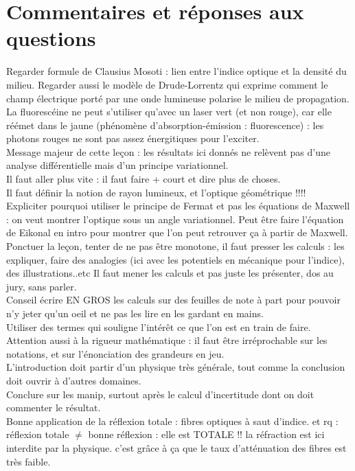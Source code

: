 \documentclass[12pt,prb,aps,epsf]{report}
\begin{document}
\section{Commentaires et réponses aux questions}
Regarder formule de Clausius Mosoti : lien entre l'indice optique et la densité du milieu. Regarder aussi le modèle de Drude-Lorrentz qui exprime comment le champ électrique porté par une onde lumineuse polarise le milieu de propagation. \\
La fluorescéine ne peut s'utiliser qu'avec un laser vert (et non rouge), car elle réémet dans le jaune (phénomène d'absorption-émission : fluorescence) : les photons rouges ne sont pas assez énergitiques pour l'exciter.\\
Message majeur de cette leçon : les résultats ici donnés ne relèvent pas d'une analyse différentielle mais d'un principe variationnel.\\
Il faut aller plus vite : il faut faire + court et dire plus de choses.\\
Il faut définir la notion de rayon lumineux, et l'optique géométrique !!!!\\
Expliciter pourquoi utiliser le principe de Fermat et pas les équations de Maxwell : on veut montrer l'optique sous un angle variationnel. Peut être faire l'équation de Eikonal en intro pour montrer que l'on peut retrouver ça à partir de Maxwell.\\
Ponctuer la leçon, tenter de ne pas être monotone, il faut presser les calculs : les expliquer, faire des analogies (ici avec les potentiels en mécanique pour l'indice), des illustrations..etc Il faut mener les calculs et pas juste les présenter, dos au jury, sans parler.\\
Conseil écrire EN GROS les calculs sur des feuilles de note à part pour pouvoir n'y jeter qu'un oeil et ne pas les lire en les gardant en mains.\\
Utiliser des termes qui souligne l'intérêt ce que l'on est en train de faire.\\
Attention aussi à la rigueur mathématique : il faut être irréprochable sur les notations, et sur l'énonciation des grandeurs en jeu.\\
L'introduction doit partir d'un physique très générale, tout comme la conclusion doit ouvrir à d'autres domaines.\\
Conclure sur les manip, surtout après le calcul d'incertitude dont on doit commenter le résultat.\\
Bonne application de la réflexion totale : fibres optiques à saut d'indice. et rq : réflexion totale $\neq$ bonne réflexion : elle est TOTALE !! la réfraction est ici interdite par la physique. c'est grâce à ça que le taux d'atténuation des fibres est très faible.\\
\end{document}

